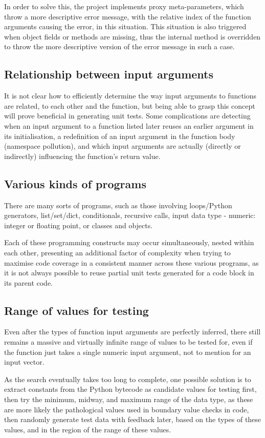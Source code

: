 \documentclass{icldt}
\numberwithin{equation}{section}       %
\begin{document}
{{In order to solve this, the project implements proxy meta-parameters, which throw a more descriptive error message, with the relative index of the function arguments causing the error, in this situation. This situation is also triggered when object fields or methods are missing, thus the internal  method is overridden to throw the more descriptive version of the error message in such a case.

\subsection{Relationship between input arguments}
It is not clear how to efficiently determine the way input arguments to functions are related, to each other and the function, but being able to grasp this concept will prove beneficial in generating unit tests. Some complications are detecting when an input argument to a function listed later reuses an earlier argument in its initialisation, a redefinition of an input argument in the function body (namespace pollution), and which input arguments are actually (directly or indirectly) influencing the function's return value.

\subsection{Various kinds of programs}
There are many sorts of programs, such as those involving loops/Python generators, list/set/dict, conditionals, recursive calls, input data type - numeric: integer or floating point, or classes and objects.

Each of these programming constructs may occur simultaneously, nested within each other, presenting an additional factor of complexity when trying to maximise code coverage in a consistent manner across these various programs, as it is not always possible to reuse partial unit tests generated for a code block in its parent code.

\subsection{Range of values for testing}
Even after the types of function input arguments are perfectly inferred, there still remains a massive and virtually infinite range of values to be tested for, even if the function just takes a single numeric input argument, not to mention for an input vector.

As the search eventually takes too long to complete, one possible solution is to extract constants from the Python bytecode as candidate values for testing first, then try the minimum, midway, and maximum range of the data type, as these are more likely the pathological values used in boundary value checks in code, then randomly generate test data with feedback later, based on the types of these values, and in the region of the range of these values.

}}
\end{document}
